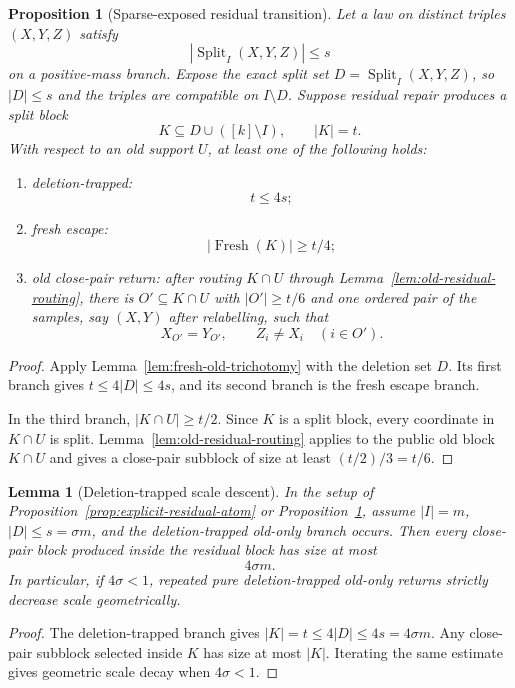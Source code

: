 \documentclass[11pt]{article}
\newtheorem{lemma}[theorem]{Lemma}
\newtheorem{proposition}[theorem]{Proposition}
\newcommand{\Split}{\operatorname{Split}}
\begin{document}
\begin{proposition}[Sparse-exposed residual transition]
\label{prop:sparse-residual-transition}
Let a law on distinct triples $(X,Y,Z)$ satisfy
\[
  |\Split_I(X,Y,Z)|\le s
\]
on a positive-mass branch.  Expose the exact split set
$D=\Split_I(X,Y,Z)$, so $|D|\le s$ and the triples are compatible on
$I\setminus D$.  Suppose residual repair produces a split block
\[
  K\subseteq D\cup([k]\setminus I),\qquad |K|=t.
\]
With respect to an old support $U$, at least one of the following holds:
\begin{enumerate}[label=\textup{(\arabic*)}]
\item deletion-trapped:
  \[
    t\le 4s;
  \]
\item fresh escape:
  \[
    |\operatorname{Fresh}(K)|\ge t/4;
  \]
\item old close-pair return: after routing $K\cap U$ through
  Lemma~\ref{lem:old-residual-routing}, there is
  $O'\subseteq K\cap U$ with $|O'|\ge t/6$ and one ordered pair of the
  samples, say $(X,Y)$ after relabelling, such that
  \[
    X_{O'}=Y_{O'},\qquad Z_i\ne X_i\quad(i\in O').
  \]
\end{enumerate}
\end{proposition}

\begin{proof}
Apply Lemma~\ref{lem:fresh-old-trichotomy} with the deletion set $D$.  Its
first branch gives $t\le 4|D|\le 4s$, and its second branch is the fresh
escape branch.

In the third branch, $|K\cap U|\ge t/2$.  Since $K$ is a split block, every
coordinate in $K\cap U$ is split.  Lemma~\ref{lem:old-residual-routing}
applies to the public old block $K\cap U$ and gives a close-pair subblock of
size at least $(t/2)/3=t/6$.
\end{proof}

\begin{lemma}[Deletion-trapped scale descent]
\label{lem:deletion-scale-descent}
In the setup of Proposition~\ref{prop:explicit-residual-atom} or
Proposition~\ref{prop:sparse-residual-transition}, assume $|I|=m$,
 $|D|\le s=\sigma m$, and the deletion-trapped old-only branch occurs.  Then
every close-pair block produced inside the residual block has size at most
\[
  4\sigma m.
\]
In particular, if $4\sigma<1$, repeated pure deletion-trapped old-only returns
strictly decrease scale geometrically.
\end{lemma}

\begin{proof}
The deletion-trapped branch gives $|K|=t\le 4|D|\le 4s=4\sigma m$.  Any
close-pair subblock selected inside $K$ has size at most $|K|$.  Iterating the same
estimate gives geometric scale decay when $4\sigma<1$.
\end{proof}
\end{document}
